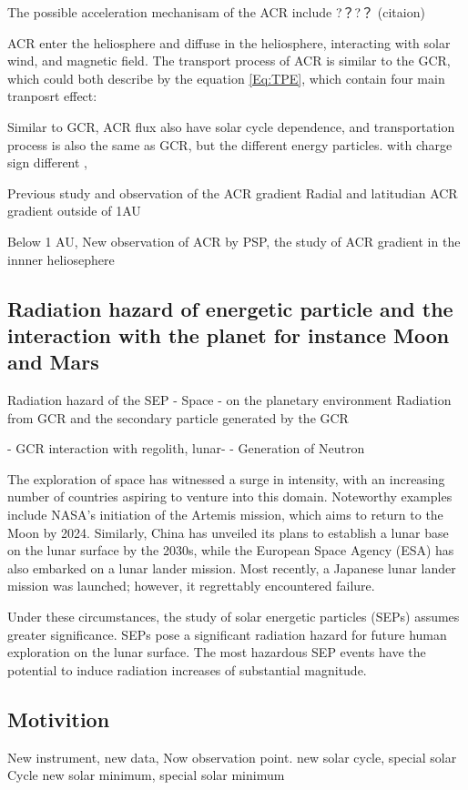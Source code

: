  The possible acceleration mechanisam of the ACR include ?？?？ (citaion)

ACR enter the heliosphere and diffuse in the heliosphere, interacting with solar wind, and magnetic field. The transport process of ACR is similar to the GCR, which could both describe by the equation \ref{Eq:TPE}, which contain four main tranposrt effect: 

Similar to GCR, ACR flux also have solar cycle dependence, and transportation process is also the same as GCR, but the different energy particles.
with charge sign different
,

Previous study and observation of the ACR gradient
	Radial and latitudian ACR gradient outside of 1AU

	Below 1 AU, New observation of ACR by PSP, the study of ACR gradient in the innner heliosephere


\subsection{Radiation hazard of energetic particle and the interaction with the planet for instance Moon and Mars}

Radiation hazard of the SEP 
- Space
- on the planetary environment
Radiation from GCR and the secondary particle generated by the GCR

- GCR interaction with regolith, lunar-
	- Generation of Neutron

The exploration of space has witnessed a surge in intensity, with an increasing number of countries aspiring to venture into this domain. Noteworthy examples include NASA's initiation of the Artemis mission, which aims to return to the Moon by 2024. Similarly, China has unveiled its plans to establish a lunar base on the lunar surface by the 2030s, while the European Space Agency (ESA) has also embarked on a lunar lander mission. Most recently, a Japanese lunar lander mission was launched; however, it regrettably encountered failure.

Under these circumstances, the study of solar energetic particles (SEPs) assumes greater significance. SEPs pose a significant radiation hazard for future human exploration on the lunar surface. The most hazardous SEP events have the potential to induce radiation increases of substantial magnitude.

\subsection{Motivition}
New instrument, new data, 
Now observation point.
new solar cycle, special solar Cycle
new solar minimum, special solar minimum
